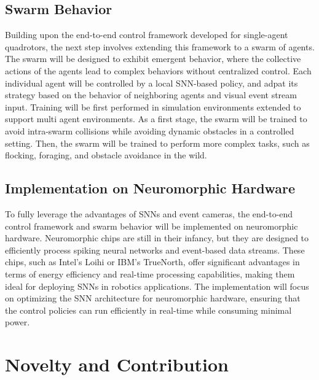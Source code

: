 \documentclass{article}
\begin{document}
\subsection{Swarm Behavior}
Building upon the end-to-end control framework developed for single-agent quadrotors, the next step involves extending this framework to a swarm of agents. The swarm will be designed to exhibit emergent behavior, where the collective actions of the agents lead to complex behaviors without centralized control. Each individual agent will be controlled  by a local SNN-based policy, and adpat its strategy based on the behavior of neighboring agents and visual event stream input. Training will be first performed in simulation environments extended to support multi agent environments. As a first stage, the swarm will be trained to avoid intra-swarm collisions while avoiding dynamic obstacles in a controlled setting. Then, the swarm will be trained to perform more complex tasks, such as flocking, foraging, and obstacle avoidance in the wild.  

\subsection{Implementation on Neuromorphic Hardware}
To fully leverage the advantages of SNNs and event cameras, the end-to-end control framework and swarm behavior will be implemented on neuromorphic hardware. Neuromorphic chips are still in their infancy, but they are designed to efficiently process spiking neural networks and event-based data streams. These chips, such as Intel's Loihi or IBM's TrueNorth, offer significant advantages in terms of energy efficiency and real-time processing capabilities, making them ideal for deploying SNNs in robotics applications. The implementation will focus on optimizing the SNN architecture for neuromorphic hardware, ensuring that the control policies can run efficiently in real-time while consuming minimal power.

\section{Novelty and Contribution}

\printbibliography[title=\section{References}]
\end{document}
